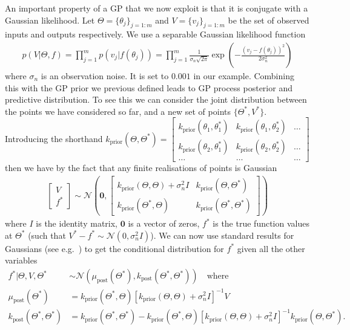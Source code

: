An important property of a GP that we now exploit is that it is conjugate with a 
Gaussian likelihood.
Let ${\Theta} = \{\theta_j\}_{j=1:m}$ and ${V} = \{{v}_j\}_{j=1:m}$ 
be the set of observed inputs and outputs respectively.
We use a separable Gaussian likelihood function
\begin{align}
\label{eq:opt:GP-lik}
p({V}| {\Theta}, f) = \prod_{j=1}^{m}p({v}_j | f(\theta_j)) = \prod_{j=1}^{m}\frac{1}{\sigma_{n}\sqrt{2\pi}} \exp \left(-\frac{\left({v}_j-f(\theta_j)\right)^2}{2\sigma_n^2}\right)
\end{align}
where $\sigma_n$ is an observation noise. It is set to $0.001$ in our example.  Combining this with the GP prior
we previous defined leads to GP process posterior and predictive distribution.
To see this we can consider the joint distribution between the points we have
considered so far, and a new set of points $\{{\Theta}^*,{V}^*\}$.
Introducing the shorthand $k_{\text{prior}}({\Theta},{\Theta}^*) = \left[\begin{smallmatrix} k_{\text{prior}}(\theta_1,\theta_1^*) & k_{\text{prior}}(\theta_1,\theta_2^*) & \dots\\ k_{\text{prior}}(\theta_2,\theta_1^*) & k_{\text{prior}}(\theta_2,\theta_2^*) & \dots \\ \dots & \dots & \dots\end{smallmatrix}\right]$ then we have by the fact that
any finite realisations of points is Gaussian
\begin{align}
\label{eq:opt:GP-joint}
\left[\begin{matrix} 
V \\ f^*
\end{matrix}\right] \sim \mathcal{N} \left(\mathbf{0}, \left[
\begin{matrix}
k_{\text{prior}}({\Theta},{\Theta})+\sigma_n^2 I & k_{\text{prior}}({\Theta},{\Theta}^*) \\
k_{\text{prior}}({\Theta}^*,{\Theta}) & k_{\text{prior}}({\Theta}^*,{\Theta}^*)
\end{matrix}
\right]\right)
\end{align}
where $I$ is the identity matrix, $\mathbf{0}$ is a vector of zeros, $f^*$ is the true
function values at ${\Theta}^*$ (such that $V^*-f^*\sim\mathcal{N}(0,\sigma_n^2 I)$).
We can now use standard results for Gaussians (see e.g.~\cite{petersen2008matrix}) to get
the conditional distribution for $f^*$ given all the other variables
\begin{align}
\label{eq:opt:GP-posterior}
f^* | \Theta, V, \Theta^* &\sim \mathcal{N}\left(\mu_{\text{post}} \left(\Theta^*\right), 
k_{\text{post}} \left(\Theta^*,\Theta^*\right) \right) \quad \text{where} \\
\mu_{\text{post}}  \left(\Theta^*\right) & = k_{\text{prior}}\left(\Theta^*,{\Theta} \right) \left[k_{\text{prior}}\left({\Theta} ,{\Theta}  \right) + \sigma_n^2 I\right]^{-1} V\\
k_{\text{post}} \left(\Theta^*,\Theta^*\right) & = k_{\text{prior}} \left(\Theta^*,\Theta^*\right) - k_{\text{prior}}\left(\Theta^*,{\Theta} \right) \left[k_{\text{prior}}\left({\Theta},{\Theta} \right) + \sigma_n^2 I\right]^{-1} k_{\text{prior}}\left({\Theta} ,\Theta^*\right).
\end{align}
